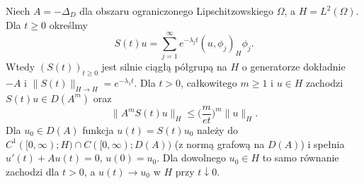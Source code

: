 \begin{twierdzenie}
\label{thm:pde12-heat}
Niech $A=-\Delta_D$ dla obszaru ograniczonego Lipschitzowskiego $\Omega$, a $H=L^2(\Omega)$.
Dla $t\ge0$ określmy
\[
S(t)u=\sum_{j=1}^\infty e^{-\lambda_jt}(u,\phi_j)_H\phi_j.
\]
Wtedy $(S(t))_{t\ge0}$ jest silnie ciągłą półgrupą na $H$
o generatorze dokładnie $-A$ i
$\|S(t)\|_{H\to H}=e^{-\lambda_1t}$.
Dla $t>0$, całkowitego $m\ge1$ i $u\in H$ zachodzi
$S(t)u\in D(A^m)$ oraz
\[
\|A^mS(t)u\|_H
\le\bigg(\frac{m}{e t}\bigg)^m\|u\|_H.
\]
Dla $u_0\in D(A)$ funkcja $u(t)=S(t)u_0$
należy do $C^1([0,\infty);H)\cap C([0,\infty);D(A))$
(z normą grafową na $D(A)$) i spełnia $u'(t)+Au(t)=0$, $u(0)=u_0$.
Dla dowolnego $u_0\in H$ to samo równanie zachodzi dla
$t>0$, a $u(t)\to u_0$ w $H$ przy $t\downarrow0$.
\end{twierdzenie}
